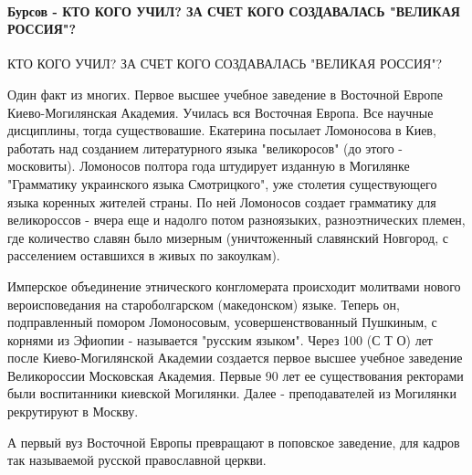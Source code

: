  
 
 
 
 
\paragraph{Бурсов - КТО КОГО УЧИЛ? ЗА СЧЕТ КОГО СОЗДАВАЛАСЬ "ВЕЛИКАЯ РОССИЯ"?}

\begin{itemize}
 
КТО КОГО УЧИЛ? ЗА СЧЕТ КОГО СОЗДАВАЛАСЬ "ВЕЛИКАЯ РОССИЯ"? 

Один факт из многих. Первое высшее учебное заведение в Восточной Европе
Киево-Могилянская Академия. Училась вся Восточная Европа. Все научные
дисциплины, тогда существовашие. Екатерина посылает Ломоносова в Киев, работать
над созданием литературного языка "великоросов" (до этого - московиты).
Ломоносов полтора года штудирует изданную в Могилянке "Грамматику украинского
языка Смотрицкого", уже столетия существующего языка коренных жителей страны.
По ней Ломоносов создает грамматику для великороссов - вчера еще и надолго
потом разноязыких, разноэтнических племен, где количество славян было мизерным
(уничтоженный славянский Новгород, с расселением оставшихся в живых по
закоулкам). 

Имперское объединение этнического конгломерата происходит молитвами нового
вероисповедания на староболгарском (македонском) языке. Теперь он,
подправленный помором Ломоносовым, усовершенствованный Пушкиным, с корнями из
Эфиопии - называется "русским языком". Через 100 (С Т О) лет после
Киево-Могилянской Академии создается первое высшее учебное заведение
Великороссии Московская Академия. Первые 90 лет ее существования ректорами были
воспитанники киевской Могилянки. Далее - преподавателей из Могилянки
рекрутируют в Москву. 

А первый вуз Восточной Европы превращают в поповское заведение, для кадров так
называемой русской православной церкви. 


\end{itemize}
